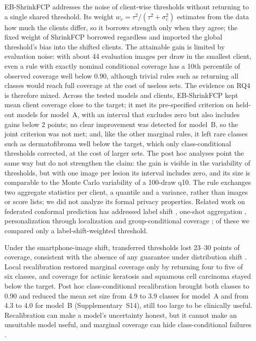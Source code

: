 \documentclass[VANCOUVER,Times1COL]{WileyNJDv5}
\begin{document}
EB-ShrinkFCP addresses the noise of client-wise thresholds without returning to a single shared threshold.
Its weight $w_c=\tau^2/(\tau^2+\sigma_c^2)$ estimates from the data how much the clients differ, so it
borrows strength only when they agree; the fixed weight of ShrinkFCP borrowed regardless and imported the
global threshold's bias into the shifted clients. The attainable gain is limited by evaluation noise: with
about 44 evaluation images per draw in the smallest client, even a rule with exactly nominal conditional
coverage has a 10th percentile of observed coverage well below 0.90, although trivial rules such as
returning all classes would reach full coverage at the cost of useless sets. The evidence on RQ4 is
therefore mixed. Across the tested models and clients, EB-ShrinkFCP kept mean client coverage close to the
target; it met its pre-specified criterion on held-out models for model~A, with an interval that excludes
zero but also includes gains below 2 points; no clear improvement was detected for model~B, so the joint criterion
was not met; and, like the other marginal rules, it left rare classes such as dermatofibroma well below the
target, which only class-conditional thresholds corrected, at the cost of larger sets. The post hoc analyses point the same way but do not strengthen the claim: the gain is visible in the
variability of thresholds, but with one image per lesion its interval includes zero, and its size is
comparable to the Monte Carlo variability of a 100-draw q10. The rule exchanges two
aggregate statistics per client, a quantile and a variance, rather than images or score lists; we did not
analyze its formal privacy properties. Related work on federated conformal prediction has addressed label
shift \cite{plassier2023labelshift}, one-shot aggregation \cite{humbert2023oneshot}, personalization
through localization \cite{min2025pfcp} and group-conditional coverage \cite{wen2026gcfcp}; of these we
compared only a label-shift-weighted threshold.

Under the smartphone-image shift, transferred thresholds lost 23--30 points of coverage, consistent with the
absence of any guarantee under distribution shift \cite{tibshirani2019covariate,barber2023beyond}. Local
recalibration restored marginal coverage only by returning four to five of six classes, and coverage for
actinic keratosis and squamous cell carcinoma stayed below the target. Post hoc class-conditional
recalibration brought both classes to 0.90 and reduced the mean set size from 4.9 to 3.9 classes for
model~A and from 4.3 to 4.0 for model~B (Supplementary~S14), still too large to be clinically useful.
Recalibration can make a model's
uncertainty honest, but it cannot make an unsuitable model useful, and marginal coverage can hide
class-conditional failures \cite{lu2022fair}.
\end{document}
